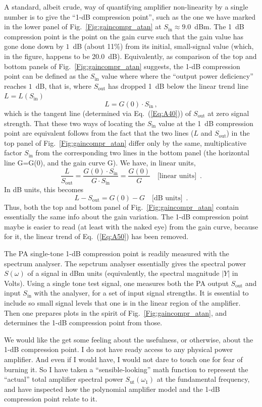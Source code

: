 \documentclass[11pt,oneside,a4paper]{scrartcl}
\newcommand{\EQ}[1]{\begin{equation}\label{Eq:#1}}
\newcommand{\EE}{\end{equation}}
\newcommand{\Eq}[1]{Eq.~(\ref{Eq:#1})}
\newcommand{\Fig}[1]{Fig.~\ref{Fig:#1}}
\newcommand{\Abs}[1]{\ensuremath{\left|#1\right|}}
\newcommand { \mr }[1] {\ensuremath {\mathrm{#1}}}
\begin{document}
A standard, albeit crude, way of quantifying amplifier non-linearity by a single number is to give the ``1-dB compression point'', such as the one we have marked in the lower panel of \Fig{gaincompr_atan} at $S_\mr{in} \approx 9.0$~dBm. The 1~dB compression point is the point on the gain curve such that the gain value has gone done down by $1$~dB (about 11\%) from its initial, small-signal value (which, in the figure, happens to be 20.0~dB). Equivalently, as comparison of the top and bottom panels of \Fig{gaincompr_atan} suggests, the 1-dB compression point can be defined as the $S_\mr{in}$ value where where the ``output power deficiency'' reaches $1$~dB, that is, where $S_\mr{out}$ has dropped 1~dB below the linear trend line $L = L(S_\mr{in})$
\EQ{A50}
	L = G(0) \cdot S_\mr{in} \,,
\EE
which is the tangent line (determined via \Eq{A40}) of $S_\mr{out}$ at zero signal strength. That these two ways of locating the $S_\mr{in}$ value at the 1~dB compression point are equivalent follows from the fact that the two lines ($L$ and $S_\mr{out}$) in the top panel of \Fig{gaincompr_atan} differ only by the same, multiplicative factor $S_\mr{in}$ from the corresponding two lines in the bottom panel (the horizontal line G=G(0), and the gain curve G). We have, in linear units,
\EQ{A60}
	\frac L {S_\mr{out}} 
	= \frac {G(0) \cdot S_\mr{in}}{G \cdot S_\mr{in}}
	= \frac {G(0)} {G}		\,\,\,\, \mbox { [linear units] } \,.
\EE
In dB units, this becomes
\EQ{A70}
	L - S_\mr{out} = G(0) - G		\,\,\,\, \mbox { [dB units] } \,. 
\EE
Thus, both the top and bottom panel of \Fig{gaincompr_atan} contain essentially the same info about the gain variation. The 1-dB compression point maybe is easier to read (at least with the naked eye) from the gain curve, because for it, the linear trend of \Eq{A50} has been removed.

The PA single-tone 1-dB compression point is readily measured with the spectrum analyser. The sepctrum analyser essentially gives the spectral power $S(\omega)$ of a signal in dBm units (equivalently, the spectral magnitude $\Abs{Y}$ in Volts). Using a single tone test signal, one measures both the PA output $S_\mr{out}$ and input $S_\mr{in}$ with the analyser, for a set of input signal strengths. It is essential to include so small signal levels that one is in the linear region of the amplifier. Then one prepares plots in the spirit of \Fig{gaincompr_atan}, and determines the 1-dB compression point from those.

We would like the get some feeling about the usefulness, or otherwise, about the 1-dB compression point. I do not have ready access to any physical power amplifier. And even if I would have, I would not dare to touch one for fear of burning it. So I have taken a ``sensible-looking'' math function to represent the ``actual'' total amplifier spectral power $S_\mr{ut}(\omega_1)$ at the fundamental frequency, and have inspected how the polynomial amplifier model and the 1-dB compression point relate to it. 
\end{document}
